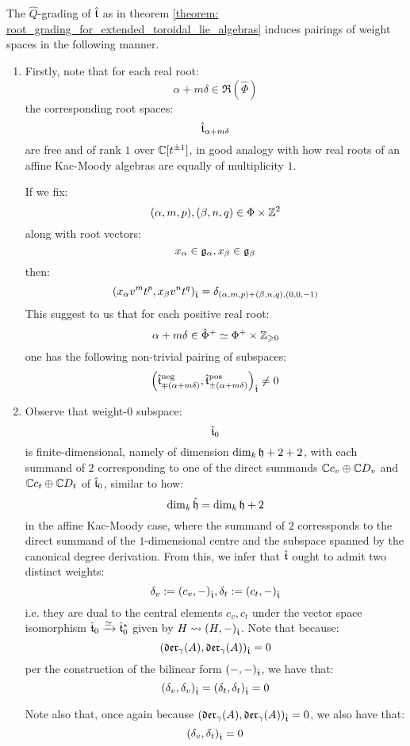         \begin{remark} \label{remark: toroidal_root_systems}
            The $\hat{Q}$-grading of $\hat{\mathfrak{t}}$ as in theorem \ref{theorem: root_grading_for_extended_toroidal_lie_algebras} induces pairings of weight spaces in the following manner.
            \begin{enumerate}
                \item  Firstly, note that for each real root:
                    $$\alpha + m\delta \in \Re(\hat{\Phi})$$
                the corresponding root spaces:
                    $$\hat{\mathfrak{t}}_{\alpha + m\delta}$$
                are free and of rank $1$ over $\mathbb{C}[t^{\pm 1}]$, in good analogy with how real roots of an affine Kac-Moody algebras are equally of multiplicity $1$.

                If we fix:
                    $$(\alpha, m, p), (\beta, n, q) \in \Phi \x \Z^2$$
                along with root vectors:
                    $$x_{\alpha} \in \mathfrak{g}_{\alpha}, x_{\beta} \in \mathfrak{g}_{\beta}$$
                then:
                    $$( x_{\alpha} v^m t^p, x_{\beta} v^n t^q )_{\hat{\mathfrak{t}}} = \delta_{(\alpha, m, p) + (\beta, n, q), (0, 0, -1)}$$
                This suggest to us that for each positive real root:
                    $$\alpha + m\delta \in \hat{\Phi}^+ \cong \Phi^+ \x \Z_{\geq 0}$$
                one has the following non-trivial pairing of subspaces:
                    $$\left( \hat{\mathfrak{t}}^{\mathrm{neg}}_{\mp (\alpha + m\delta)}, \hat{\mathfrak{t}}^{\mathrm{pos}}_{\pm (\alpha + m\delta)} \right)_{\hat{\mathfrak{t}}} \not = 0$$
                \item Observe that weight-$0$ subspace:
                    $$\hat{\mathfrak{t}}_0$$
                is finite-dimensional, namely of dimension $\dim_{k} \mathfrak{h} + 2 + 2$, with each summand of $2$ corresponding to one of the direct summands $\mathbb{C} c_v \oplus \mathbb{C} D_v$ and $\mathbb{C} c_t \oplus \mathbb{C} D_t$ of $\hat{\mathfrak{t}}_0$, similar to how:
                    $$\dim_{k} \hat{\mathfrak{h}} = \dim_{k} \mathfrak{h} + 2$$
                in the affine Kac-Moody case, where the summand of $2$ corressponds to the direct summand of the $1$-dimensional centre and the subspace spanned by the canonical degree derivation. From this, we infer that $\hat{\mathfrak{t}}$ ought to admit two distinct weights:
                    $$\delta_v := (c_v, -)_{\hat{\mathfrak{t}}}, \delta_t := (c_t, -)_{\hat{\mathfrak{t}}}$$
                i.e. they are dual to the central elements $c_v, c_t$ under the vector space isomorphism $\hat{\mathfrak{t}}_0 \xrightarrow[]{\simeq} \hat{\mathfrak{t}}_0^*$ given by $H \leadsto (H, -)_{\hat{\mathfrak{t}}}$. Note that because:
                    $$(\mathfrak{der}_{\gamma}(A), \mathfrak{der}_{\gamma}(A))_{\hat{\mathfrak{t}}} = 0$$
                per the construction of the bilinear form $(-, -)_{\hat{\mathfrak{t}}}$, we have that:
                    $$(\delta_v, \delta_v)_{\hat{\mathfrak{t}}} = (\delta_t, \delta_t)_{\hat{\mathfrak{t}}} = 0$$

                Note also that, once again because $(\mathfrak{der}_{\gamma}(A), \mathfrak{der}_{\gamma}(A))_{\hat{\mathfrak{t}}} = 0$, we also have that:
                    $$(\delta_v, \delta_t)_{\hat{\mathfrak{t}}} = 0$$
            \end{enumerate}
        \end{remark}
        
